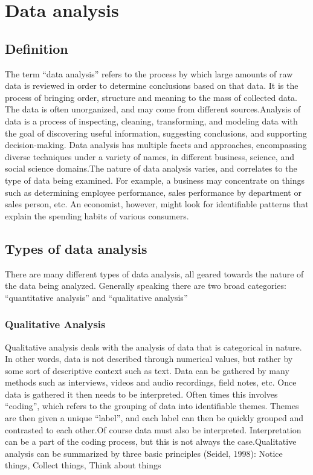 \documentclass[a4paper,12pt,oneside]{report}
\begin{document}
{\section{Data analysis}
\subsection{Definition}
{      The term “data analysis” refers to the process by which large amounts of raw data is reviewed in order to determine conclusions based on that data. It is the process of bringing order, structure and meaning to the mass of collected data. The data is often unorganized, and may come from different sources.Analysis of data is a process of inspecting, cleaning, transforming, and modeling data with the goal of discovering useful information, suggesting conclusions, and supporting decision-making. Data analysis has multiple facets and approaches, encompassing diverse techniques under a variety of names, in different business, science, and social science domains.The nature of data analysis varies, and correlates to the type of data being examined. For example, a business may concentrate on things such as determining employee performance, sales performance by department or sales person, etc. An economist, however, might look for identifiable patterns that explain the spending habits of various consumers.}
\subsection{Types of data analysis }
{     There are many different types of data analysis, all geared towards the nature of the data being analyzed. Generally speaking there are two broad categories: “quantitative analysis” and “qualitative analysis”}
\subsubsection{Qualitative Analysis}
{    Qualitative analysis deals with the analysis of data that is categorical in nature. In other words, data is not described through numerical values, but rather by some sort of descriptive context such as text. Data can be gathered by many methods such as interviews, videos and audio recordings, field notes, etc.
Once data is gathered it then needs to be interpreted. Often times this involves “coding”, which refers to the grouping of data into identifiable themes. Themes are then given a unique “label”, and each label can then be quickly grouped and contrasted to each other.Of course data must also be interpreted. Interpretation can be a part of the coding process, but this is not always the case.Qualitative analysis can be summarized by three basic principles (Seidel, 1998):
Notice things, Collect things, Think about things}
}
\end{document}
